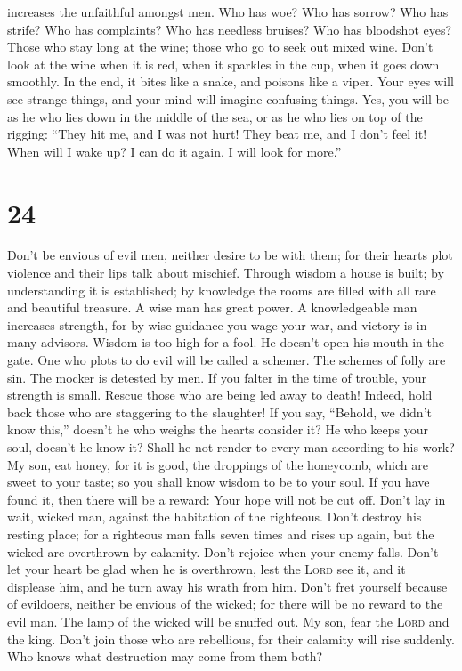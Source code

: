 increases the unfaithful amongst men.  Who has woe? Who
has sorrow? Who has strife? Who has complaints? Who has needless
bruises? Who has bloodshot eyes?  Those who stay long at
the wine; those who go to seek out mixed wine.  Don't
look at the wine when it is red, when it sparkles in the cup, when it
goes down smoothly.  In the end, it bites like a snake,
and poisons like a viper.  Your eyes will see strange
things, and your mind will imagine confusing things. 
Yes, you will be as he who lies down in the middle of the sea, or as he
who lies on top of the rigging:  ``They hit me, and I was
not hurt! They beat me, and I don't feel it! When will I wake up? I can
do it again. I will look for more.''

\hypertarget{section-23}{%
\section{24}\label{section-23}}

 Don't be envious of evil men, neither desire to be with
them;  for their hearts plot violence and their lips talk
about mischief.  Through wisdom a house is built; by
understanding it is established;  by knowledge the rooms
are filled with all rare and beautiful treasure.  A wise
man has great power. A knowledgeable man increases strength,
 for by wise guidance you wage your war, and victory is in
many advisors.  Wisdom is too high for a fool. He doesn't
open his mouth in the gate.  One who plots to do evil will
be called a schemer.  The schemes of folly are sin. The
mocker is detested by men.  If you falter in the time of
trouble, your strength is small.  Rescue those who are
being led away to death! Indeed, hold back those who are staggering to
the slaughter!  If you say, ``Behold, we didn't know
this,'' doesn't he who weighs the hearts consider it? He who keeps your
soul, doesn't he know it? Shall he not render to every man according to
his work?  My son, eat honey, for it is good, the
droppings of the honeycomb, which are sweet to your taste;
 so you shall know wisdom to be to your soul. If you have
found it, then there will be a reward: Your hope will not be cut off.
 Don't lay in wait, wicked man, against the habitation of
the righteous. Don't destroy his resting place;  for a
righteous man falls seven times and rises up again, but the wicked are
overthrown by calamity.  Don't rejoice when your enemy
falls. Don't let your heart be glad when he is overthrown,
 lest the \textsc{Lord} see it, and it displease him, and
he turn away his wrath from him.  Don't fret yourself
because of evildoers, neither be envious of the wicked; 
for there will be no reward to the evil man. The lamp of the wicked will
be snuffed out.  My son, fear the \textsc{Lord} and the
king. Don't join those who are rebellious,  for their
calamity will rise suddenly. Who knows what destruction may come from
them both?

